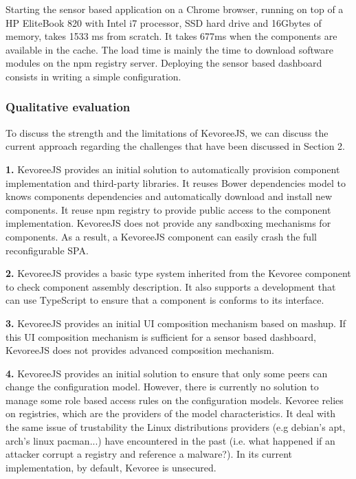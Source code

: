 Starting the sensor based application on a Chrome browser, running on top of a HP EliteBook 820 with Intel i7 processor, SSD hard drive and 16Gbytes of memory, takes 1533 ms from scratch. It takes 677ms when the components are available in the cache. The load time is mainly the time to download software modules on the npm registry server. Deploying the sensor based dashboard consists in writing a simple configuration.    


\subsubsection{Qualitative evaluation  }
To discuss the strength and the limitations of KevoreeJS, we can discuss the current approach regarding the challenges that have been discussed in Section 2.   

\indent \textbf{1.} KevoreeJS provides an initial solution to automatically provision component implementation and third-party libraries. It reuses Bower dependencies model to knows components dependencies and automatically download and install new components. It reuse npm registry to provide public access to the component implementation. KevoreeJS does not provide any sandboxing mechanisms for components. As a result, a KevoreeJS component can easily crash the full reconfigurable SPA. 

\indent \textbf{2.} KevoreeJS provides a basic type system inherited from the Kevoree component to check component assembly description. It also supports a development that can use TypeScript to ensure that a component is conforms to its interface.  

\indent \textbf{3.} KevoreeJS provides an initial UI composition mechanism based on mashup. If this UI composition mechanism is sufficient for a sensor based dashboard, KevoreeJS does not provides advanced composition mechanism.  

\indent \textbf{4.} KevoreeJS provides an initial solution to ensure that only some peers can change the configuration model. However, there is currently no solution to manage some role based access rules on the configuration models. Kevoree relies on registries, which are the providers of the model characteristics. It deal with the same issue of trustability the Linux distributions providers (e.g debian's apt, arch's linux pacman...) have encountered in the past (i.e. what happened if an attacker corrupt a registry and reference a malware?).  In its current implementation, by default, Kevoree is unsecured.   

